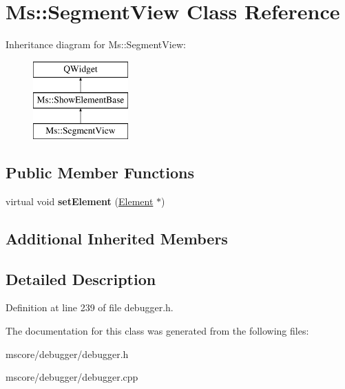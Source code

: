 \hypertarget{class_ms_1_1_segment_view}{}\section{Ms\+:\+:Segment\+View Class Reference}
\label{class_ms_1_1_segment_view}
Inheritance diagram for Ms\+:\+:Segment\+View\+:\begin{figure}[H]
\begin{center}
\leavevmode
\includegraphics[height=3.000000cm]{class_ms_1_1_segment_view}
\end{center}
\end{figure}
\subsection*{Public Member Functions}
\begin{DoxyCompactItemize}
\item 
\mbox{\label{class_ms_1_1_segment_view_abc3f8ed658e1249636c849a0b99c299d}} 
virtual void {\bfseries set\+Element} (\hyperlink{class_ms_1_1_element}{Element} $\ast$)
\end{DoxyCompactItemize}
\subsection*{Additional Inherited Members}


\subsection{Detailed Description}


Definition at line 239 of file debugger.\+h.



The documentation for this class was generated from the following files\+:\begin{DoxyCompactItemize}
\item 
mscore/debugger/debugger.\+h\item 
mscore/debugger/debugger.\+cpp\end{DoxyCompactItemize}
